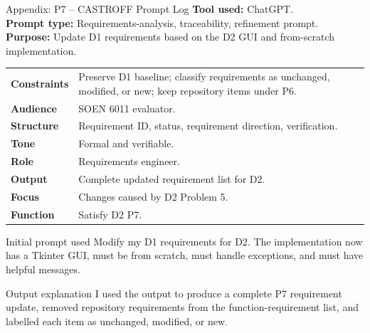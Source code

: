\documentclass[10pt,aspectratio=169]{beamer}
\newcommand{\smallnote}[1]{\vspace{0.2em}{\scriptsize\textcolor{linegray}{#1}}}
\begin{document}
\begin{frame}{Appendix: P7 -- CASTROFF Prompt Log}
\tiny
\textbf{Tool used:} ChatGPT.\\
\textbf{Prompt type:} Requirements-analysis, traceability, refinement prompt.\\
\textbf{Purpose:} Update D1 requirements based on the D2 GUI and from-scratch implementation.
\vspace{0.35em}
\begin{tabularx}{\textwidth}{>{\bfseries}p{1.45cm}X}
Constraints & Preserve D1 baseline; classify requirements as unchanged, modified, or new; keep repository items under P6.\\
Audience & SOEN 6011 evaluator.\\
Structure & Requirement ID, status, requirement direction, verification.\\
Tone & Formal and verifiable.\\
Role & Requirements engineer.\\
Output & Complete updated requirement list for D2.\\
Focus & Changes caused by D2 Problem 5.\\
Function & Satisfy D2 P7.\\
\end{tabularx}
\begin{block}{Initial prompt used}
Modify my D1 requirements for D2. The implementation now has a Tkinter GUI, must be from scratch, must handle exceptions, and must have helpful messages.
\end{block}
\begin{block}{Output explanation}
I used the output to produce a complete P7 requirement update, removed repository requirements from the function-requirement list, and labelled each item as unchanged, modified, or new.
\end{block}
\vfill\smallnote{Source: [6].}
\end{frame}
\end{document}
